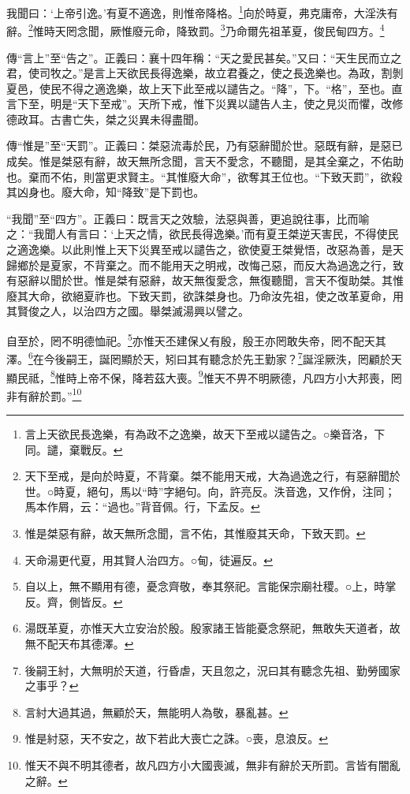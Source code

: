 我聞曰：‘上帝引逸。’有夏不適逸，則惟帝降格。\footnote{言上天欲民長逸樂，有為政不之逸樂，故天下至戒以譴告之。○樂音洛，下同。譴，棄戰反。}向於時夏，弗克庸帝，大淫泆有辭。\footnote{天下至戒，是向於時夏，不背棄。桀不能用天戒，大為過逸之行，有惡辭聞於世。○時夏，絕句，馬以“時”字絕句。向，許亮反。泆音逸，又作佾，注同；馬本作屑，云：“過也。”背音佩。行，下孟反。}惟時天罔念聞，厥惟廢元命，降致罰。\footnote{惟是桀惡有辭，故天無所念聞，言不佑，其惟廢其天命，下致天罰。}乃命爾先祖革夏，俊民甸四方。\footnote{天命湯更代夏，用其賢人治四方。○甸，徒遍反。}


{\noindent\zhuan{}\fzbyks 傳“言上”至“告之”。正義曰：襄十四年稱：“天之愛民甚矣。”又曰：“天生民而立之君，使司牧之。”是言上天欲民長得逸樂，故立君養之，使之長逸樂也。為政，割剝夏邑，使民不得之適逸樂，故上天下此至戒以譴告之。“降”，下。“格”，至也。直言下至，明是“天下至戒”。天所下戒，惟下災異以譴告人主，使之見災而懼，改修德政耳。古書亡失，桀之災異未得盡聞。 \par}

{\noindent\zhuan{}\fzbyks 傳“惟是”至“天罰”。正義曰：桀惡流毒於民，乃有惡辭聞於世。惡既有辭，是惡已成矣。惟是桀惡有辭，故天無所念聞，言天不愛念，不聽聞，是其全棄之，不佑助也。棄而不佑，則當更求賢主。“其惟廢大命”，欲奪其王位也。“下致天罰”，欲殺其凶身也。廢大命，知“降致”是下罰也。 \par}

{\noindent\shu{}\fzkt “我聞”至“四方”。正義曰：既言天之效驗，法惡與善，更追說往事，比而喻之：“我聞人有言曰：‘上天之情，欲民長得逸樂。’而有夏王桀逆天害民，不得使民之適逸樂。以此則惟上天下災異至戒以譴告之，欲使夏王桀覺悟，改惡為善，是天歸鄉於是夏家，不背棄之。而不能用天之明戒，改悔己惡，而反大為過逸之行，致有惡辭以聞於世。惟是桀有惡辭，故天無復愛念，無復聽聞，言天不復助桀。其惟廢其大命，欲絕夏祚也。下致天罰，欲誅桀身也。乃命汝先祖，使之改革夏命，用其賢俊之人，以治四方之國。舉桀滅湯興以譬之。 \par}

自至於，罔不明德恤祀。\footnote{自以上，無不顯用有德，憂念齊敬，奉其祭祀。言能保宗廟社稷。○上，時掌反。齊，側皆反。}亦惟天丕建保乂有殷，殷王亦罔敢失帝，罔不配天其澤。\footnote{湯既革夏，亦惟天大立安治於殷。殷家諸王皆能憂念祭祀，無敢失天道者，故無不配天布其德澤。}在今後嗣王，誕罔顯於天，矧曰其有聽念於先王勤家？\footnote{後嗣王紂，大無明於天道，行昏虐，天且忽之，況曰其有聽念先祖、勤勞國家之事乎？}誕淫厥泆，罔顧於天顯民祗，\footnote{言紂大過其過，無顧於天，無能明人為敬，暴亂甚。}惟時上帝不保，降若茲大喪。\footnote{惟是紂惡，天不安之，故下若此大喪亡之誅。○喪，息浪反。}惟天不畀不明厥德，凡四方小大邦喪，罔非有辭於罰。”\footnote{惟天不與不明其德者，故凡四方小大國喪滅，無非有辭於天所罰。言皆有闇亂之辭。}


